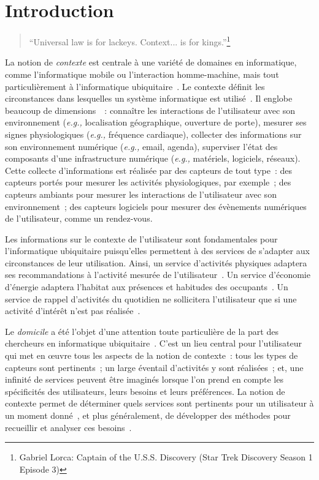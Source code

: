 \chapter{Introduction}
\begin{quote}
``Universal law is for lackeys.
Context... is for kings.''\footnote{Gabriel Lorca: Captain of the U.S.S. Discovery (Star Trek Discovery Season 1 Episode 3)}
\end{quote}

La notion de {\em contexte} est centrale à une variété de domaines en 
informatique, comme l'informatique mobile ou l'interaction homme-machine,
mais tout particulièrement à l’informatique 
ubiquitaire~. Le contexte 
définit les circonstances dans lesquelles un système informatique est 
utilisé~. Il englobe beaucoup de 
dimensions~~: connaître les interactions de 
l’utilisateur avec son environnement ({\em e.g.,} localisation géographique, 
ouverture de porte), mesurer  ses signes physiologiques ({\em e.g.,} fréquence 
cardiaque), collecter des informations sur son environnement numérique 
({\em e.g.,} email, agenda), superviser l’état des composants d’une 
infrastructure numérique ({\em e.g.,} matériels, logiciels, réseaux). Cette 
collecte d’informations est réalisée par des capteurs de tout type~: des capteurs 
portés pour mesurer les activités physiologiques, par exemple~; des capteurs ambiants 
pour mesurer les interactions de l’utilisateur avec son environnement~; 
des capteurs logiciels pour mesurer des évènements numériques de l’utilisateur, 
comme un rendez-vous.

Les informations sur le contexte de l’utilisateur sont fondamentales pour 
l'informatique ubiquitaire puisqu’elles permettent à des services de s’adapter 
aux circonstances de leur utilisation. Ainsi, un service d’activités physiques 
adaptera ses recommandations à l’activité mesurée de 
l’utilisateur~.  Un service d’économie d’énergie adaptera 
l’habitat aux présences et habitudes des occupants~. 
Un service de rappel d’activités du quotidien ne sollicitera l’utilisateur que 
si une activité d’intérêt n’est pas réalisée~. 

Le {\em domicile} a été l’objet d’une attention toute particulière de la part 
des chercheurs en informatique 
ubiquitaire~. C’est un lieu 
central pour l’utilisateur qui met en {\oe}uvre tous les aspects de la notion 
de contexte~: tous les types de capteurs sont pertinents~; un large éventail 
d’activités y sont réalisées~; et, une infinité de services peuvent être imaginés 
lorsque l’on prend en compte les spécificités des utilisateurs, leurs besoins et 
leurs préférences. La notion de contexte permet de déterminer quels services sont 
pertinents pour un utilisateur à un moment donné~, et plus généralement, 
de développer des méthodes pour recueillir et analyser ces 
besoins~.

